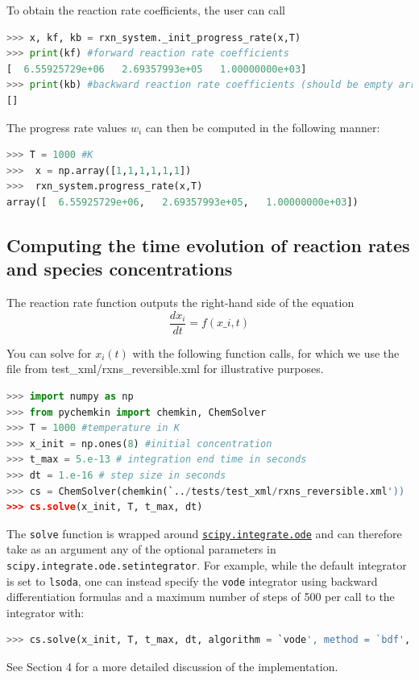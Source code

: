 \documentclass[12pt]{article}
\begin{document}
To obtain the reaction rate coefficients, the user can call 
\begin{lstlisting}[language = Python, basicstyle = \ttfamily,columns = fullflexible, showstringspaces = False]
>>> x, kf, kb = rxn_system._init_progress_rate(x,T)
>>> print(kf) #forward reaction rate coefficients
[  6.55925729e+06   2.69357993e+05   1.00000000e+03]
>>> print(kb) #backward reaction rate coefficients (should be empty array since all reactions are irreversible)
[]
\end{lstlisting}

The progress rate values $w_i$ can then be computed in the following manner:
\begin{lstlisting}[language = Python, basicstyle = \ttfamily,columns = fullflexible, showstringspaces = False]
>>> T = 1000 #K
>>>  x = np.array([1,1,1,1,1,1])
>>>  rxn_system.progress_rate(x,T)
array([  6.55925729e+06,   2.69357993e+05,   1.00000000e+03])
\end{lstlisting}

\subsection{Computing the time evolution of reaction rates and species concentrations}
The reaction rate function outputs the right-hand side of the equation
\begin{equation}
\frac{dx_i}{dt} = f(x\_i, t)
\end{equation}

You can solve for $x_i(t)$ with the following function calls, for which we use the file from test\_xml/rxns\_reversible.xml for illustrative purposes. 
\begin{lstlisting}[language = Python, basicstyle = \ttfamily,columns = fullflexible, showstringspaces = False]
>>> import numpy as np
>>> from pychemkin import chemkin, ChemSolver
>>> T = 1000 #temperature in K
>>> x_init = np.ones(8) #initial concentration
>>> t_max = 5.e-13 # integration end time in seconds
>>> dt = 1.e-16 # step size in seconds
>>> cs = ChemSolver(chemkin(`../tests/test_xml/rxns_reversible.xml'))
>>> cs.solve(x_init, T, t_max, dt)
\end{lstlisting}

The \texttt{solve} function is wrapped around \href{https://docs.scipy.org/doc/scipy/reference/generated/scipy.integrate.ode.html}{\texttt{scipy.integrate.ode}} and can therefore take as an argument any of the optional parameters in \texttt{scipy.integrate.ode.setintegrator}. For example, while the default integrator is set to \texttt{lsoda}, one can instead specify the \texttt{vode} integrator using backward differentiation formulas and a maximum number of steps of 500 per call to the integrator with: 
\begin{lstlisting}[language = Python, basicstyle = \ttfamily,columns = fullflexible, showstringspaces = False]
>>> cs.solve(x_init, T, t_max, dt, algorithm = `vode', method = `bdf', nsteps = 500). 

\end{lstlisting}
See Section 4 for a more detailed discussion of the implementation. 
\end{document}
